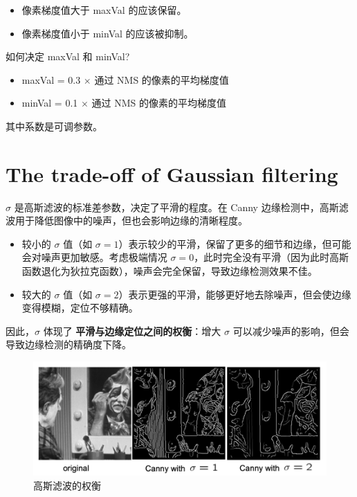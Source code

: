 \begin{itemize}
    \item 像素梯度值大于 maxVal 的应该保留。
    \item 像素梯度值小于 minVal 的应该被抑制。
\end{itemize}

如何决定 maxVal 和 minVal?

\begin{itemize}
    \item maxVal = 0.3 $\times$ 通过 NMS 的像素的平均梯度值
    \item minVal = 0.1 $\times$ 通过 NMS 的像素的平均梯度值
\end{itemize}

其中系数是可调参数。

\section{The trade-off of Gaussian filtering}

$\sigma$ 是高斯滤波的标准差参数，决定了平滑的程度。在 Canny 边缘检测中，高斯滤波用于降低图像中的噪声，但也会影响边缘的清晰程度。

\begin{itemize}
    \item 较小的 $\sigma$ 值（如 $\sigma = 1$）表示较少的平滑，保留了更多的细节和边缘，但可能会对噪声更加敏感。考虑极端情况 $\sigma = 0$，此时完全没有平滑（因为此时高斯函数退化为狄拉克函数），噪声会完全保留，导致边缘检测效果不佳。
    \item 较大的 $\sigma$ 值（如 $\sigma = 2$）表示更强的平滑，能够更好地去除噪声，但会使边缘变得模糊，定位不够精确。
\end{itemize}

因此，$\sigma$ 体现了 \textbf{平滑与边缘定位之间的权衡}：增大 $\sigma$ 可以减少噪声的影响，但会导致边缘检测的精确度下降。

\begin{figure}[htbp]
    \centering
	\includegraphics[width=0.8\linewidth]{figures/tradeoff-in-gauss-filtering.png}
	\caption{高斯滤波的权衡}
\end{figure}

